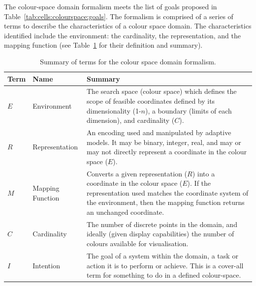 The colour-space domain formalism meets the list of goals proposed in Table~\ref{tab:cells:colourspace:goals}. The formalism is comprised of a series of terms to describe the characteristics of a colour space domain. The characteristics identified include the environment: the cardinality, the representation, and the mapping function (see Table~\ref{tab:cells:colourspace:definition} for their definition and summary).

\begin{table}[ht]
	\centering\small
		\begin{tabularx}{\textwidth}{llX}
		\toprule
		\textbf{Term} & \textbf{Name} & \textbf{Summary} \\ 
		\toprule
		$E$ & Environment & The search space (colour space) which defines the scope of feasible coordinates defined by its dimensionality (1-$n$), a boundary (limits of each dimension), and cardinality ($C$). \\ 
		\midrule
		$R$ & Representation & An encoding used and manipulated by adaptive models. It may be binary, integer, real, and may or may not directly represent a coordinate in the colour space ($E$). \\ 
		\midrule
		$M$ & Mapping Function & Converts a given representation ($R$) into a coordinate in the colour space ($E$). If the representation used matches the coordinate system of the environment, then the mapping function returns an unchanged coordinate. \\ 
		\midrule
		$C$ & Cardinality & The number of discrete points in the domain, and ideally (given display capabilities) the number of colours available for visualisation. \\ 
		\midrule
		$I$ & Intention & The goal of a system within the domain, a task or action it is to perform or achieve. This is a cover-all term for something to do in a defined colour-space. \\ 
		\bottomrule
		\end{tabularx}	
	\caption{Summary of terms for the colour space domain formalism.}
	\label{tab:cells:colourspace:definition}
\end{table}

